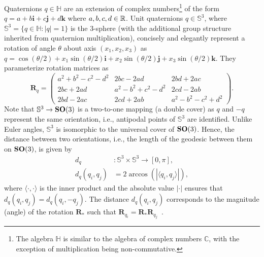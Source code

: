 Quaternions $q \in \mathbb{H}$ are an extension of complex numbers\footnote{The algebra $\mathbb{H}$ is similar to the algebra of complex numbers $\mathbb{C}$, with the exception of multiplication being non-commutative.} of the form $q = a + b\boldsymbol{i} + c\boldsymbol{j} + d\boldsymbol{k}$ where $a,b,c,d \in \mathbb{R}$.
Unit quaternions $q \in \mathbb{S}^3$, where $\mathbb{S}^3 = \big\{ q \in \mathbb{H}: \lvert q \rvert = 1 \big\}$ is the 3-sphere (with the additional group structure inherited from quaternion multiplication), concisely and elegantly represent a rotation of angle $\theta$ about axis $(x_1, x_2, x_3)$ as $q = \cos(\theta/2) + x_1 \sin(\theta/2) \boldsymbol{i} + x_2 \sin(\theta/2) \boldsymbol{j} + x_3 \sin(\theta/2) \boldsymbol{k}$.
They parameterize rotation matrices as
\begin{equation*}
    \mathbf{R}_q =
    \begin{pmatrix}
        a^2+b^2-c^2-d^2 & 2bc-2ad & 2bd+2ac \\
        2bc+2ad & a^2-b^2+c^2-d^2 & 2cd-2ab \\
        2bd-2ac & 2cd+2ab & a^2-b^2-c^2+d^2
    \end{pmatrix}.
\end{equation*}
Note that $\mathbb{S}^3 \rightarrow \mathrm{\mathbf{SO}}(3)$ is a two-to-one mapping (a double cover) as $q$ and $-q$ represent the same orientation, i.e., antipodal points of $\mathbb{S}^3$ are identified.
Unlike Euler angles, $\mathbb{S}^3$ is isomorphic to the universal cover of $\mathrm{\mathbf{SO}}(3)$.
Hence, the distance between two orientations, i.e., the length of the geodesic between them on $\mathrm{\mathbf{SO}}(3)$, is given by
\begin{equation}
    \begin{aligned}
        d_q &: \mathbb{S}^3 \times \mathbb{S}^3 \rightarrow [0,\pi], \\
        d_q(q_i, q_j) &= 2 \arccos \left( \left| \langle q_i, q_j \rangle \right| \right),
    \label{eqn:distance:orientations}
    \end{aligned}
\end{equation}
where $\langle \cdot, \cdot \rangle$ is the inner product and the absolute value $\left| \cdot \right|$ ensures that $d_q(q_i, q_j) = d_q(q_i, -q_j)$.
The distance $d_q(q_i, q_j)$ corresponds to the magnitude (angle) of the rotation $\mathbf{R}_*$ such that $\mathbf{R}_{q_i} = \mathbf{R}_* \mathbf{R}_{q_j}$~\cite{huynh2009metrics}.

